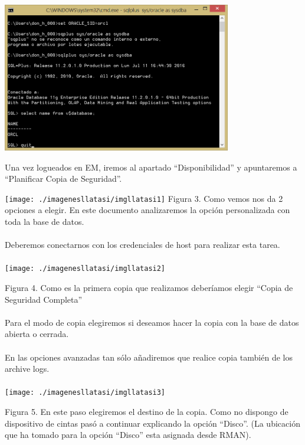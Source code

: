 \documentclass[12pt,letterpaper]{article}
\begin{document}
{\includegraphics[width=10cm]{./imagen/imagen-1}

Una vez logueados en EM, iremos al apartado “Disponibilidad” y apuntaremos a
“Planificar Copia de Seguridad”.

\texttt{[image: ./imagenesllatasi/imgllatasi1]}
Figura 3. Como vemos nos da 2 opciones a elegir. En este documento analizaremos la opción personalizada con toda la base de datos. \\\\

Deberemos conectarnos con los credenciales de host para realizar esta tarea.  \\\\

\texttt{[image: ./imagenesllatasi/imgllatasi2]}

Figura 4. Como  es  la  primera  copia  que  realizamos  deberíamos  elegir  “Copia  de  Seguridad Completa”\\\\

Para el modo de copia elegiremos si deseamos hacer la copia con la base de datos abierta o cerrada.\\\\


En las opciones avanzadas tan sólo añadiremos que realice copia también de los archive logs.\\\\

\texttt{[image: ./imagenesllatasi/imgllatasi3]}

Figura 5. En este paso elegiremos el destino de la copia. Como no dispongo de dispositivo de cintas pasó a continuar explicando la opción “Disco”. (La ubicación que ha tomado para la opción “Disco” esta asignada desde RMAN). \\\\

}
\end{document}
